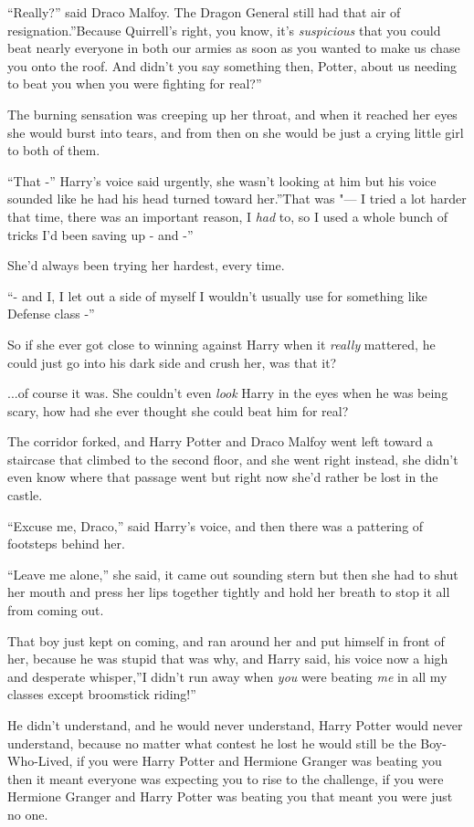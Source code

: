 ``Really?'' said Draco Malfoy. The Dragon General still had that air of
resignation.''Because Quirrell's right, you know, it's \emph{suspicious}
that you could beat nearly everyone in both our armies as soon as you
wanted to make us chase you onto the roof. And didn't you say something
then, Potter, about us needing to beat you when you were fighting for
real?''

The burning sensation was creeping up her throat, and when it reached
her eyes she would burst into tears, and from then on she would be just
a crying little girl to both of them.

``That -'' Harry's voice said urgently, she wasn't looking at him but
his voice sounded like he had his head turned toward her.''That was "--- I
tried a lot harder that time, there was an important reason, I
\emph{had} to, so I used a whole bunch of tricks I'd been saving up -
and -''

She'd always been trying her hardest, every time.

``- and I, I let out a side of myself I wouldn't usually use for
something like Defense class -''

So if she ever got close to winning against Harry when it \emph{really}
mattered, he could just go into his dark side and crush her, was that
it?

...of course it was. She couldn't even \emph{look} Harry in the
eyes when he was being scary, how had she ever thought she could beat
him for real?

The corridor forked, and Harry Potter and Draco Malfoy went left toward
a staircase that climbed to the second floor, and she went right
instead, she didn't even know where that passage went but right now
she'd rather be lost in the castle.

``Excuse me, Draco,'' said Harry's voice, and then there was a pattering
of footsteps behind her.

``Leave me alone,'' she said, it came out sounding stern but then she
had to shut her mouth and press her lips together tightly and hold her
breath to stop it all from coming out.

That boy just kept on coming, and ran around her and put himself in
front of her, because he was stupid that was why, and Harry said, his
voice now a high and desperate whisper,''I didn't run away when
\emph{you} were beating \emph{me} in all my classes except broomstick
riding!''

He didn't understand, and he would never understand, Harry Potter would
never understand, because no matter what contest he lost he would still
be the Boy-Who-Lived, if you were Harry Potter and Hermione Granger was
beating you then it meant everyone was expecting you to rise to the
challenge, if you were Hermione Granger and Harry Potter was beating you
that meant you were just no one.

